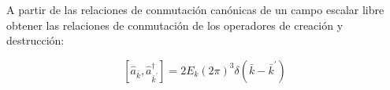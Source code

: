 A partir de las relaciones de conmutación canónicas de un campo escalar libre obtener las relaciones de conmutación de los operadores de creación y destrucción:

$$
\left[\hat{a}_{\bar{k}}, \hat{a}_{\bar{k}^{\prime}}^{\dagger}\right]=2 E_{k}(2 \pi)^{3} \delta\left(\bar{k}-\bar{k}^{\prime}\right)
$$

\begin{solution}\ \\

\end{solution}